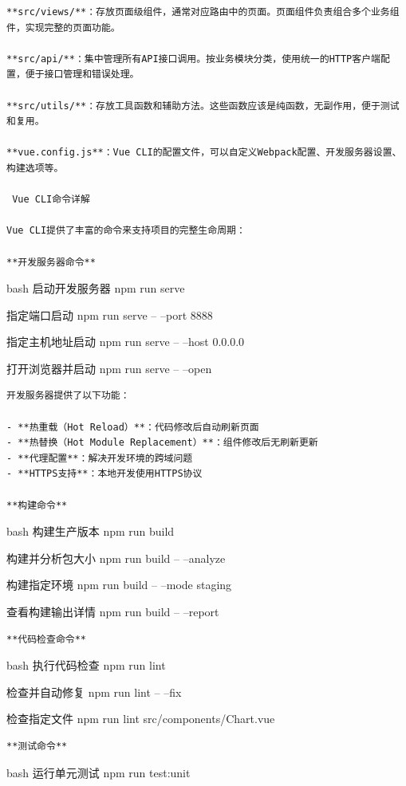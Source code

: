 {{\begin{lstlisting}
**src/views/**：存放页面级组件，通常对应路由中的页面。页面组件负责组合多个业务组件，实现完整的页面功能。

**src/api/**：集中管理所有API接口调用。按业务模块分类，使用统一的HTTP客户端配置，便于接口管理和错误处理。

**src/utils/**：存放工具函数和辅助方法。这些函数应该是纯函数，无副作用，便于测试和复用。

**vue.config.js**：Vue CLI的配置文件，可以自定义Webpack配置、开发服务器设置、构建选项等。

 Vue CLI命令详解

Vue CLI提供了丰富的命令来支持项目的完整生命周期：

**开发服务器命令**
\end{lstlisting}

bash  启动开发服务器 npm run serve

 指定端口启动 npm run serve -- --port 8888

 指定主机地址启动 npm run serve -- --host 0.0.0.0

 打开浏览器并启动 npm run serve -- --open

\begin{lstlisting}
开发服务器提供了以下功能：

- **热重载（Hot Reload）**：代码修改后自动刷新页面
- **热替换（Hot Module Replacement）**：组件修改后无刷新更新
- **代理配置**：解决开发环境的跨域问题
- **HTTPS支持**：本地开发使用HTTPS协议

**构建命令**
\end{lstlisting}

bash  构建生产版本 npm run build

 构建并分析包大小 npm run build -- --analyze

 构建指定环境 npm run build -- --mode staging

 查看构建输出详情 npm run build -- --report

\begin{lstlisting}
**代码检查命令**
\end{lstlisting}

bash  执行代码检查 npm run lint

 检查并自动修复 npm run lint -- --fix

 检查指定文件 npm run lint src/components/Chart.vue

\begin{lstlisting}
**测试命令**
\end{lstlisting}

bash  运行单元测试 npm run test:unit

}}
